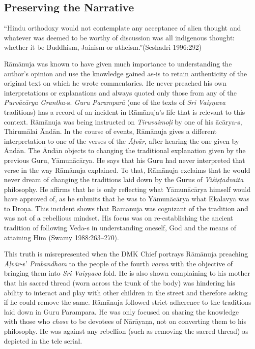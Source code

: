 \subsection*{Preserving the Narrative}

\begin{myquote}
“Hindu orthodoxy would not contemplate any acceptance of alien thought and whatever was deemed to be worthy of discussion was all indigenous thought: whether it be Buddhism, Jainism or atheism.”(Seshadri 1996:292)
\end{myquote}

Rāmānuja was known to have given much importance to understanding the author’s opinion and use the knowledge gained as-is to retain authenticity of the original text on which he wrote commentaries. He never preached his own interpretations or explanations and always quoted only those from any of the \textit{Purvācārya Grantha}-s. \textit{Guru Paramparā} (one of the texts of \textit{Sri Vaiṣņava} traditions) has a record of an incident in Rāmānuja’s life that is relevant to this context. Rāmānuja was being instructed on \textit{Tiruvaimoḷi }by one of his ācārya-s, Thirumālai Āndān. In the course of events, Rāmānuja gives a different interpretation to one of the verses of the \textit{Āḷvār}, after hearing the one given by Āndān. The Āndān objects to changing the traditional explanation given by the previous Guru, Yāmunācārya. He says that his Guru had never interpreted that verse in the way Rāmānuja explained. To that, Rāmānuja exclaims that he would never dream of changing the traditions laid down by the Gurus of \textit{Viśiṣṭādvaita} philosophy. He affirms that he is only reflecting what Yāmunācārya himself would have approved of, as he submits that he was to Yāmunācārya what Ekalavya was to Droṇa. This incident shows that Rāmānuja was cognizant of the tradition and was not of a rebellious mindset. His focus was on re-establishing the ancient tradition of following Veda-s in understanding oneself, God and the means of attaining Him (Swamy 1988:263–270).

This truth is misrepresented when the DMK Chief portrays Rāmānuja preaching \textit{Āḷvār}-s’ \textit{Prabandham} to the people of the fourth\textit{ varņa} with the objective of bringing them into \textit{Sri Vaiṣņava} fold. He is also shown complaining to his mother that his sacred thread (worn across the trunk of the body) was hindering his ability to interact and play with other children in the street and therefore asking if he could remove the same. Rāmānuja followed strict adherence to the traditions laid down in Guru Parampara. He was only focused on sharing the knowledge with those who \textit{chose} to be devotees of Nārāyaṇa, not on converting them to his philosophy. He was against any rebellion (such as removing the sacred thread) as depicted in the tele serial.

